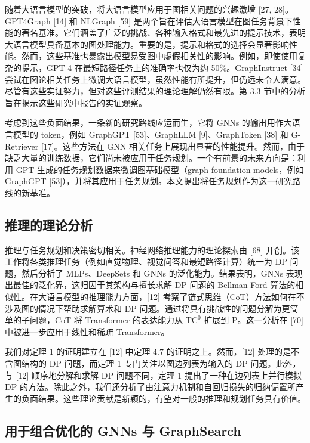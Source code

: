 \documentclass[11pt,UTF8,fontset=fandol]{ctexart}
\begin{document}
随着大语言模型的突破，将大语言模型应用于图相关问题的兴趣激增 [27, 28]。GPT4Graph [14] 和 NLGraph [59] 是两个旨在评估大语言模型在图任务背景下性能的著名基准。它们涵盖了广泛的挑战、各种输入格式和最先进的提示技术，表明大语言模型具备基本的图处理能力。重要的是，提示和格式的选择会显著影响性能。然而，这些基准也暴露出模型易受图中虚假相关性的影响。例如，即使使用复杂的提示，GPT-4 在最短路径任务上的准确率也仅为约 50\%。GraphInstruct [34] 尝试在图论相关任务上微调大语言模型，虽然性能有所提升，但仍远未令人满意。尽管有这些实证努力，但对这些评测结果的理论理解仍然有限。第 3.3 节中的分析旨在揭示这些研究中报告的实证观察。

考虑到这些负面结果，一条新的研究路线应运而生，它将 GNNs 的输出用作大语言模型的 token，例如 GraphGPT [53]、GraphLLM [9]、GraphToken [38] 和 G-Retriever [17]。这些方法在 GNN 相关任务上展现出显著的性能提升。然而，由于缺乏大量的训练数据，它们尚未被应用于任务规划。一个有前景的未来方向是：利用 GPT 生成的任务规划数据来微调图基础模型（graph foundation models，例如 GraphGPT [53]），并将其应用于任务规划。本文提出将任务规划作为这一研究路线的新基准。

\subsection{推理的理论分析}

推理与任务规划和决策密切相关。神经网络推理能力的理论探索由 [68] 开创。该工作将各类推理任务（例如直觉物理、视觉问答和最短路径计算）统一为 DP 问题，然后分析了 MLPs、DeepSets 和 GNNs 的泛化能力。结果表明，GNNs 表现出最佳的泛化界，这归因于其架构与擅长求解 DP 问题的 Bellman-Ford 算法的相似性。在大语言模型的推理能力方面，[12] 考察了链式思维（CoT）方法如何在不涉及图的情况下帮助求解算术和 DP 问题。通过将具有挑战性的问题分解为更简单的子问题，CoT 将 Transformer 的表达能力从 $\mathrm{TC}^0$ 扩展到 $\mathrm{P}$。这一分析在 [70] 中被进一步应用于线性和稀疏 Transformer。

我们对定理 1 的证明建立在 [12] 中定理 4.7 的证明之上。然而，[12] 处理的是不含图结构的 DP 问题，而定理 1 专门关注以图边列表为输入的 DP 问题。此外，与 [12] 顺序地分解和求解 DP 问题不同，定理 1 提出了一种在边列表上并行模拟 DP 的方法。除此之外，我们还分析了由注意力机制和自回归损失的归纳偏置所产生的负面结果。这些理论贡献是新颖的，有望对一般的推理和规划任务具有价值。

\subsection{用于组合优化的 GNNs 与 GraphSearch}
\end{document}
